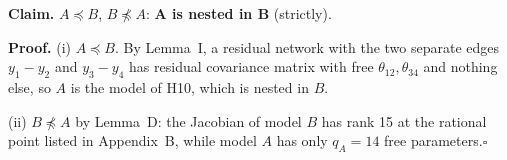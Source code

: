 \documentclass[10pt,a4paper]{article}
\newcommand{\nest}{\preceq}
\newcommand{\nnest}{\not\preceq}
\begin{document}
\par\bigskip
\noindent\textbf{Claim.} $A \nest B$, $B \nnest A$: \textbf{A is nested in B} (strictly).\par\smallskip
\noindent\textbf{Proof.} (i) $A\nest B$. By Lemma~I, a residual network with the two separate edges $y_1-y_2$ and $y_3-y_4$ has residual covariance matrix with free $\theta_{12},\theta_{34}$ and nothing else, so $A$ is the model of H10, which is nested in $B$.\par\smallskip
\noindent(ii) $B\nnest A$ by Lemma~D: the Jacobian of model $B$ has rank 15 at the rational point listed in Appendix~B, while model $A$ has only $q_A=14$ free parameters.\hfill$\square$\par\medskip
{}

\clearpage
\end{document}
